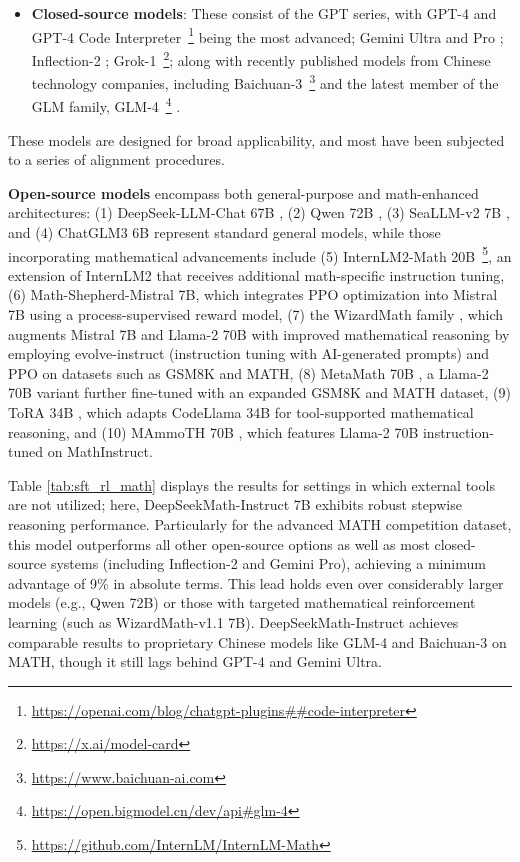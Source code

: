 \begin{itemize}[topsep=0pt]
    \item \textbf{Closed-source models}: These consist of the GPT series, with GPT-4 \citep{gpt4} and GPT-4 Code Interpreter~\footnote{\url{https://openai.com/blog/chatgpt-plugins\#\#code-interpreter}} being the most advanced; Gemini Ultra and Pro \citep{gemini}; Inflection-2 \citep{inflection-2}; Grok-1~\footnote{\url{https://x.ai/model-card}}; along with recently published models from Chinese technology companies, including Baichuan-3~\footnote{\url{https://www.baichuan-ai.com}} and the latest member of the GLM family, GLM-4~\footnote{\url{https://open.bigmodel.cn/dev/api\#glm-4}} \citep{glm}.
\end{itemize}

These models are designed for broad applicability, and most have been subjected to a series of alignment procedures.

\item \textbf{Open-source models} encompass both general-purpose and math-enhanced architectures: (1) DeepSeek-LLM-Chat 67B \citep{deepseek-llm}, (2) Qwen 72B \citep{qwen}, (3) SeaLLM-v2 7B \citep{seallm}, and (4) ChatGLM3 6B \citep{chatglm3} represent standard general models, while those incorporating mathematical advancements include (5) InternLM2-Math 20B~\footnote{\url{https://github.com/InternLM/InternLM-Math}}, an extension of InternLM2 that receives additional math-specific instruction tuning, (6) Math-Shepherd-Mistral 7B, which integrates PPO optimization \citep{schulman2017proximal} into Mistral 7B \citep{mistral} using a process-supervised reward model, (7) the WizardMath family \citep{wizardmath}, which augments Mistral 7B and Llama-2 70B \citep{llama2} with improved mathematical reasoning by employing evolve-instruct (instruction tuning with AI-generated prompts) and PPO on datasets such as GSM8K and MATH, (8) MetaMath 70B \citep{metamath}, a Llama-2 70B variant further fine-tuned with an expanded GSM8K and MATH dataset, (9) ToRA 34B \cite{tora}, which adapts CodeLlama 34B for tool-supported mathematical reasoning, and (10) MAmmoTH 70B \citep{MathInstruct}, which features Llama-2 70B instruction-tuned on MathInstruct.

Table \ref{tab:sft_rl_math} displays the results for settings in which external tools are not utilized; here, DeepSeekMath-Instruct 7B exhibits robust stepwise reasoning performance. Particularly for the advanced MATH competition dataset, this model outperforms all other open-source options as well as most closed-source systems (including Inflection-2 and Gemini Pro), achieving a minimum advantage of 9\% in absolute terms. This lead holds even over considerably larger models (e.g., Qwen 72B) or those with targeted mathematical reinforcement learning (such as WizardMath-v1.1 7B). DeepSeekMath-Instruct achieves comparable results to proprietary Chinese models like GLM-4 and Baichuan-3 on MATH, though it still lags behind GPT-4 and Gemini Ultra.


